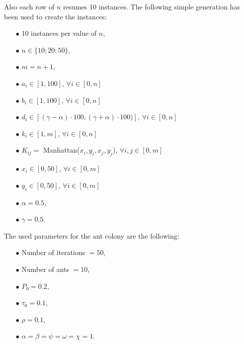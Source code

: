 \documentclass[UTF8, twoside]{EPURapport}
\begin{document}
	Also each row of $n$ resumes 10 instances. The following simple generation has been used to create the instances:
\begin{itemize}
\item[$\bullet$] 10 instances per value of $n$,
\item[$\bullet$] $n \in \{10; 20; 50\}$,
\item[$\bullet$] $m = n+1$,
\item[$\bullet$] $a_i \in \left[1,100\right]$, $\forall i \in [0, n]$
\item[$\bullet$] $b_i \in \left[1,100\right]$, $\forall i \in [0, n]$
\item[$\bullet$] $d_i \in \left[(\gamma-\alpha)\cdot100, (\gamma+\alpha)\cdot100)\right]$, $\forall i \in [0, n]$
\item[$\bullet$] $k_i \in \left[1,m\right]$, $\forall i \in [0, n]$
\item[$\bullet$] $K_{ij} = $ Manhattan($x_i,y_i,x_j,y_j$), $\forall i,j \in [0,m]$
\item[$\bullet$] $x_i \in \left[0,50\right]$, $\forall i \in [0,m]$
\item[$\bullet$] $y_i \in \left[0,50\right]$, $\forall i \in [0,m]$
\item[$\bullet$] $\alpha = 0.5$,
\item[$\bullet$] $\gamma = 0.5$.\\
\end{itemize}

	The used parameters for the ant colony are the following: 
\begin{itemize}
\item[$\bullet$] Number of iterations $= 50$,
\item[$\bullet$] Number of ants $= 10$,
\item[$\bullet$] $P_0 = 0.2$,
\item[$\bullet$] $\tau_{0} = 0.1$,
\item[$\bullet$] $\rho = 0.1$,
\item[$\bullet$] $\alpha = \beta = \psi = \omega = \chi = 1$.
\end{itemize}
\end{document}
